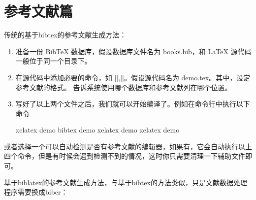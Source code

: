 %
%
%
%

\section{参考文献篇}



传统的基于bibtex的参考文献生成方法：

\begin{enumerate}

\item
  准备一份 BibTeX 数据库，假设数据库文件名为 books.bib，和 LaTeX
  源代码一般位于同一个目录下。
\item
  在源代码中添加必要的命令，如 ||,||。假设源代码名为
   demo.tex。其中，设定参考文献的格式。
  告诉系统使用哪个数据库和参考文献列在哪个位置。
\item
  写好了以上两个文件之后，我们就可以开始编译了。例如在命令行中执行以下命令
  
\begin{texinlist}
xelatex demo
bibtex demo
xelatex demo
xelatex demo
\end{texinlist}
\end{enumerate}



或者选择一个可以自动检测是否有参考文献的编辑器，如果有，它会自动执行以上四个命令，但是有时候会遇到检测不到的情况，这时你只需要清理一下辅助文件即可。

基于biblatex的参考文献生成方法，与基于bibtex的方法类似，只是文献数据处理程序需要换成biber：

